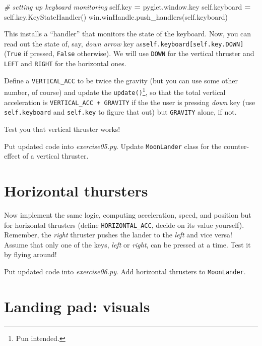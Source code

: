 \documentclass[
]{book}
\newenvironment{Shaded}{\begin{snugshade}}{\end{snugshade}}
\newcommand{\CommentTok}[1]{\textcolor[rgb]{0.56,0.35,0.01}{\textit{#1}}}
\newcommand{\NormalTok}[1]{#1}
\newcommand{\OperatorTok}[1]{\textcolor[rgb]{0.81,0.36,0.00}{\textbf{#1}}}
\newcommand{\VariableTok}[1]{\textcolor[rgb]{0.00,0.00,0.00}{#1}}
\begin{document}
\begin{Shaded}
\begin{Highlighting}[]
\CommentTok{\# setting up keyboard monitoring}
\VariableTok{self}\NormalTok{.key }\OperatorTok{=}\NormalTok{ pyglet.window.key}
\VariableTok{self}\NormalTok{.keyboard }\OperatorTok{=} \VariableTok{self}\NormalTok{.key.KeyStateHandler()}
\NormalTok{win.winHandle.push\_handlers(}\VariableTok{self}\NormalTok{.keyboard)}
\end{Highlighting}
\end{Shaded}

This installs a ``handler'' that monitors the state of the keyboard. Now, you can read out the state of, say, \emph{down arrow} key as\texttt{self.keyboard{[}self.key.DOWN{]}} (\texttt{True} if pressed, \texttt{False} otherwise). We will use \texttt{DOWN} for the vertical thruster and \texttt{LEFT} and \texttt{RIGHT} for the horizontal ones.

Define a \texttt{VERTICAL\_ACC} to be twice the gravity (but you can use some other number, of course) and update the \texttt{update()}\footnote{Pun intended.}, so that the total vertical acceleration is \texttt{VERTICAL\_ACC\ +\ GRAVITY} if the the user is pressing \emph{down} key (use \texttt{self.keyboard} and \texttt{self.key} to figure that out) but \texttt{GRAVITY} alone, if not.

Test you that vertical thruster works!

Put updated code into \emph{exercise05.py}. Update \texttt{MoonLander} class for the counter-effect of a vertical thruster.

\hypertarget{horizontal-thursters}{%
\section{Horizontal thursters}\label{horizontal-thursters}}

Now implement the same logic, computing acceleration, speed, and position but for horizontal thrusters (define \texttt{HORIZONTAL\_ACC}, decide on its value yourself). Remember, the \emph{right} thruster pushes the lander to the \emph{left} and vice versa! Assume that only one of the keys, \emph{left} or \emph{right}, can be pressed at a time. Test it by flying around!

Put updated code into \emph{exercise06.py}. Add horizontal thrusters to \texttt{MoonLander}.

\hypertarget{landing-pad-visuals}{%
\section{Landing pad: visuals}\label{landing-pad-visuals}}
\end{document}
